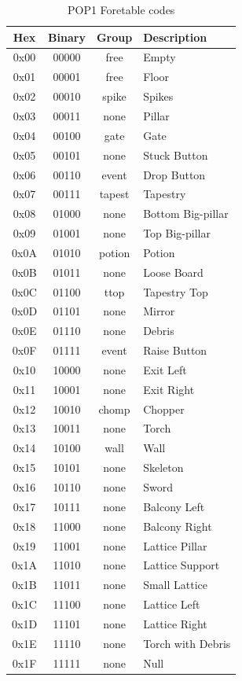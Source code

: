 \documentclass{article}
\begin{document}
\begin{table}
\begin{tabular}{cccl}
\hline
 Hex & Binary& Group & Description \\
\hline
0x00 & 00000 & free  & Empty \\
0x01 & 00001 & free  & Floor \\
0x02 & 00010 & spike & Spikes \\
0x03 & 00011 & none  & Pillar \\
0x04 & 00100 & gate  & Gate \\
0x05 & 00101 & none  & Stuck Button \\
0x06 & 00110 & event & Drop Button \\
0x07 & 00111 & tapest& Tapestry \\
0x08 & 01000 & none  & Bottom Big-pillar \\
0x09 & 01001 & none  & Top Big-pillar \\
0x0A & 01010 & potion& Potion \\
0x0B & 01011 & none  & Loose Board \\
0x0C & 01100 & ttop  & Tapestry Top \\
0x0D & 01101 & none  & Mirror \\
0x0E & 01110 & none  & Debris \\
0x0F & 01111 & event & Raise Button \\
0x10 & 10000 & none  & Exit Left \\
0x11 & 10001 & none  & Exit Right \\
0x12 & 10010 & chomp & Chopper \\
0x13 & 10011 & none  & Torch \\
0x14 & 10100 & wall  & Wall \\
0x15 & 10101 & none  & Skeleton \\
0x16 & 10110 & none  & Sword \\
0x17 & 10111 & none  & Balcony Left \\
0x18 & 11000 & none  & Balcony Right \\
0x19 & 11001 & none  & Lattice Pillar \\
0x1A & 11010 & none  & Lattice Support \\
0x1B & 11011 & none  & Small Lattice \\
0x1C & 11100 & none  & Lattice Left \\
0x1D & 11101 & none  & Lattice Right \\
0x1E & 11110 & none  & Torch with Debris \\
0x1F & 11111 & none  & Null \\
\hline
\end{tabular}
\caption{POP1 Foretable codes}
\label{palettes table}
\end{table}
\end{document}
